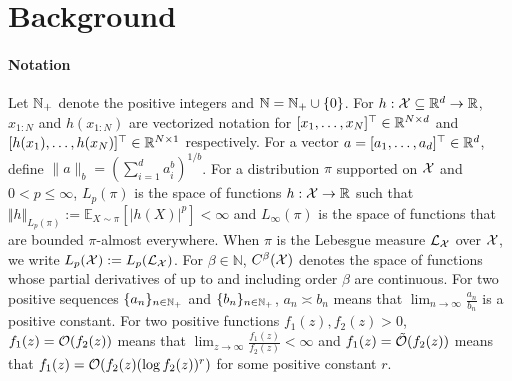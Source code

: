 \section{Background}\label{sec:background}


\paragraph{Notation}
Let $\mathbb{N}_+$ denote the positive integers and $\mathbb{N} = \mathbb{N}_+ \cup \{ 0 \}$. 
For $h:\mathcal{X} \subseteq \mathbb{R}^d \to \mathbb{R}$, $x_{1:N}$ and $h(x_{1:N})$ are vectorized notation for $[x_1, \ldots, x_N]^\top \in \mathbb{R}^{N \times d}$ and $[h(x_1), \ldots, h(x_N)]^\top \in \mathbb{R}^{N \times 1}$ respectively.
For a vector $a = [a_1 ,\ldots, a_d]^\top \in \mathbb{R}^{d}$, define $\|a\|_{b} = ( \sum_{i=1}^{d} a_i^b)^{1/b}$.
For a distribution $\pi$ supported on $\mathcal{X}$ and $0 < p \leq \infty$, $L_p(\pi)$ is the space of functions $h : \mathcal{X} \to \mathbb{R}$ such that $\Vert h \Vert_{L_p(\pi)} := \mathbb{E}_{X \sim \pi} [|h(X)|^p] < \infty$ and 
$L_\infty(\pi)$ is the space of functions that are bounded $\pi$-almost everywhere. 
When $\pi$ is the Lebesgue measure $\mathcal{L}_{\mathcal{X}}$ over $\mathcal{X}$, we write $L_p(\mathcal{X}) := L_p(\mathcal{L}_{\mathcal{X}})$. 
For $\beta \in \mathbb{N}$, $C^\beta(\mathcal{X})$ denotes the space of functions whose partial derivatives of up to and including order $\beta$ are continuous. 
For two positive sequences $\{a_n\}_{n \in \mathbb{N}_+}$ and $\{b_n\}_{n \in \mathbb{N}_+}$, $a_n \asymp b_n$ means that $\lim_{n\to \infty} \frac{a_n}{b_n}$ is a positive constant. For two positive functions $f_1(z), f_2(z) > 0$, $f_1(z) = \mathcal{O}(f_2(z))$ means that $\lim_{z \to \infty} \frac{f_1(z)}{f_2(z)} < \infty$ and $f_1(z) = \Tilde{\mathcal{O}}(f_2(z))$ means that $f_1(z) = \mathcal{O}(f_2(z) (\log f_2(z))^r)$ for some positive constant $r$.


